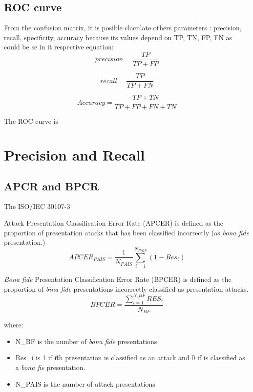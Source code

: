\subsection{ROC curve}
From the confusion matrix, it is posible claculate others parameters \cite{Sokolova}: precision, recall, specificity, accuracy because its values depend on TP, TN, FP, FN as could be se in it respective equation:\\
\begin{equation}
  precision = \frac{TP}{TP + FP}
\end{equation}

\begin{equation}
  recall = \frac{TP}{TP + FN}
\end{equation}

\begin{equation}
  Accuracy = \frac{TP + TN}{TP + FP + FN + TN}
\end{equation}

The ROC curve is \\

\section{Precision and Recall}

\subsection{APCR and BPCR}
The ISO/IEC 30107-3 \cite{ISO}

Attack Presentation Classification Error Rate (APCER) is defined as the proportion of presentation atacks that has been classified incorrectly (as \textit{bona fide} presentation.)\\

\begin{equation}
  APCER_{PAIS} = \frac{1}{N_{PAIS}}\sum_{i=1}^{N_{PAIS}}(1 - Res_{i})
\end{equation}

\textit{Bona fide} Presentation Classification Error Rate (BPCER) is defined as the proportion of \textit{bina fide} presentations  incorrectly classified as presentation attacks.\\

\begin{equation}
  BPCER = \frac{\sum_{i=1}^{N\_{BF}}RES_{i}}{N_{BF}}
\end{equation}


where: \begin{itemize}
\item N\_{BF} is the number of \textit{bona fide} presentations
\item Res\_{i} is 1 if i\^{th} presentation is classified as an attack and 0 if is classified as a \textit{bona fie} presentation.
\item N\_{PAIS} is the number of attack presentations
\end{itemize}
